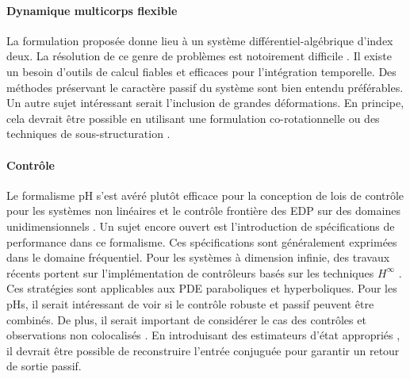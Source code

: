 \paragraph{Dynamique multicorps flexible}
La formulation proposée donne lieu à un système différentiel-algébrique d'index deux. La résolution de ce genre de problèmes est notoirement difficile \cite{brenan1995dae}. Il existe un besoin d'outils de calcul fiables et efficaces pour l'intégration temporelle. Des méthodes préservant le caractère passif du système sont bien entendu préférables. \\ Un autre sujet intéressant serait l'inclusion de grandes déformations. En principe, cela devrait être possible en utilisant une formulation co-rotationnelle ou des techniques de sous-structuration \cite{wu1988substructuring}.

\paragraph{Contrôle}
Le formalisme pH s'est avéré plutôt efficace pour la conception de lois de contrôle pour les systèmes non linéaires \cite{ortega2004survey} et le contrôle frontière des EDP sur des domaines unidimensionnels \cite{macchelli2020exponential}. Un sujet encore ouvert est l'introduction de spécifications de performance dans ce formalisme. Ces spécifications sont généralement exprimées dans le domaine fréquentiel. Pour les systèmes à dimension infinie, des travaux récents portent sur l'implémentation de contrôleurs basés sur les techniques $ H^\infty $ \cite{apkarian2018structured,apkarian2020bd}. Ces stratégies sont applicables aux PDE paraboliques et hyperboliques. Pour les pHs, il serait intéressant de voir si le contrôle robuste et  passif peuvent être combinés. De plus, il serait important de considérer le cas des contrôles et observations non colocalisés \cite{cardoso2016}. En introduisant des estimateurs d'état appropriés \cite{yaghmaei2019}, il devrait être possible de reconstruire l'entrée conjuguée pour garantir un retour de sortie passif.

